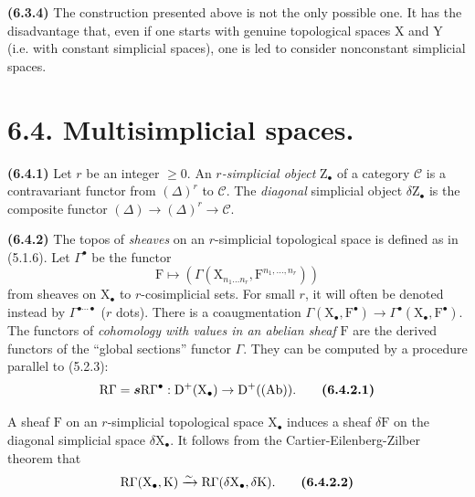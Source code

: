 \documentclass[11pt,leqno]{article}
\begin{document}
\textbf{(6.3.4)} The construction presented above is not the only possible one. It has the disadvantage that, even if one starts with genuine topological spaces \(\mathrm{X}\) and \(\mathrm{Y}\) (i.e. with constant simplicial spaces), one is led to consider nonconstant simplicial spaces.

\section*{6.4. Multisimplicial spaces.}

\textbf{(6.4.1)} Let \(r\) be an integer \(\geq 0\). An \textit{\(r\)-simplicial object} \(\mathrm{Z}_{\bullet}\) of a category \(\mathscr{C}\) is a contravariant functor from \((\Delta)^r\) to \(\mathscr{C}\). The \textit{diagonal} simplicial object \(\delta\mathrm{Z}_{\bullet}\) is the composite functor \((\Delta)\to(\Delta)^r\to\mathscr{C}\).

\textbf{(6.4.2)} The topos of \textit{sheaves} on an \(r\)-simplicial topological space is defined as in (5.1.6). Let \(\Gamma^{\bullet}\) be the functor
\[
\mathrm{F}\mapsto
(\Gamma(\mathrm{X}_{n_1\ldots n_r},\mathrm{F}^{n_1,\ldots,n_r}))
\]
from sheaves on \(\mathrm{X}_{\bullet}\) to \(r\)-cosimplicial sets. For small \(r\), it will often be denoted instead by \(\Gamma^{\bullet\cdots\bullet}\) (\(r\) dots). There is a coaugmentation \(\Gamma(\mathrm{X}_{\bullet},\mathrm{F}^{\bullet})\to\Gamma^{\bullet}(\mathrm{X}_{\bullet},\mathrm{F}^{\bullet})\). The functors of \textit{cohomology with values in an abelian sheaf} \(\mathrm{F}\) are the derived functors of the “global sections” functor \(\Gamma\). They can be computed by a procedure parallel to (5.2.3):
\[
\mathrm{R}\Gamma=\boldsymbol{s}\mathrm{R}\Gamma^{\bullet}:
\mathrm{D}^{+}(\mathrm{X}_{\bullet})\to\mathrm{D}^{+}((\mathrm{Ab})).
\tag*{\textbf{(6.4.2.1)}}
\]

A sheaf \(\mathrm{F}\) on an \(r\)-simplicial topological space \(\mathrm{X}_{\bullet}\) induces a sheaf \(\delta\mathrm{F}\) on the diagonal simplicial space \(\delta\mathrm{X}_{\bullet}\). It follows from the Cartier-Eilenberg-Zilber theorem that
\[
\mathrm{R}\Gamma(\mathrm{X}_{\bullet},\mathrm{K})
\xrightarrow{\sim}
\mathrm{R}\Gamma(\delta\mathrm{X}_{\bullet},\delta\mathrm{K}).
\tag*{\textbf{(6.4.2.2)}}
\]
\end{document}
